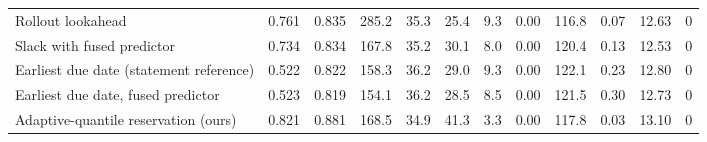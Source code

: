 \begin{table}[htbp]
\begin{tabular}{lrrrrrrrrrrr}
Rollout lookahead & 0.761 & 0.835 & 285.2 & 35.3 & 25.4 & 9.3 & 0.00 & 116.8 & 0.07 & 12.63 & 0 \\
Slack with fused predictor & 0.734 & 0.834 & 167.8 & 35.2 & 30.1 & 8.0 & 0.00 & 120.4 & 0.13 & 12.53 & 0 \\
Earliest due date (statement reference) & 0.522 & 0.822 & 158.3 & 36.2 & 29.0 & 9.3 & 0.00 & 122.1 & 0.23 & 12.80 & 0 \\
Earliest due date, fused predictor & 0.523 & 0.819 & 154.1 & 36.2 & 28.5 & 8.5 & 0.00 & 121.5 & 0.30 & 12.73 & 0 \\
Adaptive-quantile reservation (ours) & 0.821 & 0.881 & 168.5 & 34.9 & 41.3 & 3.3 & 0.00 & 117.8 & 0.03 & 13.10 & 0 \\
\midrule
\bottomrule
\end{tabular}
\end{table}
